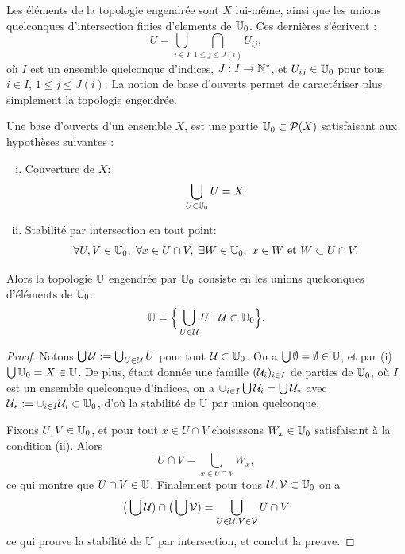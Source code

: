 Les éléments de la topologie engendrée sont $X$ lui-même, ainsi que les unions quelconques d'intersection finies d'elements de $\mathbb{U}_0$. Ces dernières s'écrivent : 
$$
	U = \bigcup_{i \in I} \bigcap_{1 \leq j \leq J(i)} U_{ij},
$$
où $I$ est un ensemble quelconque d'indices, $J : I \to \mathbb{N}^*$, et $U_{ij} \in \mathbb{U}_0$ pour tous $i \in I$, $1 \leq j \leq J(i)$. 
La notion de base d'ouverts permet de caractériser plus simplement la topologie engendrée. 

\begin{proposition}
\label{prop:baseOuverts}
%
Une base d'ouverts d'un ensemble $X$, est une partie $\mathbb{U}_0 \subset \mathcal{P}(X)$ satisfaisant aux hypothèses suivantes : 
	\begin{enumerate}[(i)]
		\item Couverture de $X$:
		\begin{equation*}
			\bigcup_{U \in \mathbb{U}_0} U = X.
		\end{equation*}
		\item Stabilité par intersection en tout point:
		\begin{equation*}			
		\forall U,V \in \bU_0,\ \forall x \in U \cap V,\ \exists W \in \bU_0,\ x\in W \text{ et } W \subset U \cap V.
		\end{equation*}
	\end{enumerate}
	Alors la topologie $\mathbb{U}$ engendrée par $\mathbb{U}_0$ consiste en les unions quelconques d'éléments de $\mathbb{U}_0$: 
	\begin{equation}
	\label{eq:topo_engendree}
		\mathbb{U} = \Big\{ \bigcup_{U \in \mathcal{U}} U \mid \mathcal{U} \subset \mathbb{U}_0\Big\}.
	\end{equation}
\end{proposition}

\begin{proof}
	Notons $\bigcup \mathcal{U} := \bigcup_{U \in \mathcal{U}} U$ pour tout $\mathcal{U} \subset \mathbb{U}_0$. On a $\bigcup \emptyset = \emptyset \in \mathbb{U}$, et par (i) $\bigcup\mathbb{U}_0 = X \in \mathbb{U}$.  
	De plus, étant donnée une famille $(\mathcal{U}_i)_{i \in I}$ de parties de $\mathbb{U}_0$, où $I$ est un ensemble quelconque d'indices, on a $\cup_{i\in I} \bigcup \mathcal{U}_i = \bigcup \mathcal{U}_*$ avec $\mathcal{U}_* := \cup_{i \in  I} \mathcal{U}_i \subset \mathbb{U}_0$, d'où la stabilité de $\mathbb{U}$ par union quelconque. 
	
	Fixons $U,V \in \mathbb{U}_0$, et pour tout $x \in U \cap V$ choisissons $W_x\in \mathbb{U}_0$ satisfaisant à la condition (ii). Alors 
	$$
		U \cap V = \bigcup_{x \in U \cap V} W_x,
	$$
	ce qui montre que $U \cap V \in \mathbb{U}$. 	
	Finalement pour tous $\mathcal{U}, \mathcal{V} \subset \mathbb{U}_0$ on a 
	\begin{equation*}
		\big(\bigcup \mathcal{U}) \cap \big(\bigcup \mathcal{V}) = \bigcup_{U\in\mathcal{U}, V \in \mathcal{V}} U \cap V 
	\end{equation*}
	ce qui prouve la stabilité de $\mathbb{U}$ par intersection, et conclut la preuve.
\end{proof}

